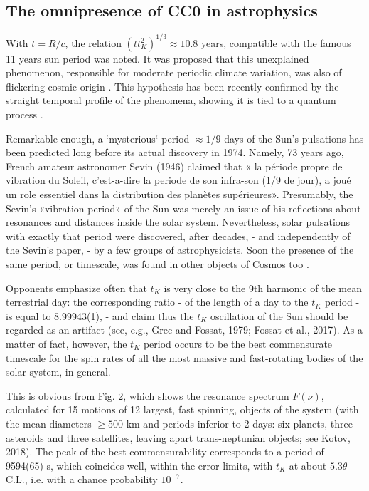 \documentclass[twoside,draft]{article}
\begin{document}
\begin{sloppypar}
\subsection{The omnipresence of CC0 in astrophysics}

With $t = R/c$, the relation $(t t_{K}^2)^{1/3} \approx 10.8$ years, compatible with the famous 11 years sun period was noted. It was proposed that this unexplained phenomenon, responsible for moderate periodic climate variation, was also of flickering cosmic origin \cite{Sanchez3}. This hypothesis has been recently confirmed by the straight temporal profile of the phenomena, showing it is tied to a quantum process \cite{Kotov2}.

Remarkable enough, a `mysterious` period $\approx 1/9$ days of the Sun's pulsations has been predicted long before its actual discovery in 1974. Namely, 73 years ago, French amateur astronomer Sevin (1946) claimed that « la p\'{e}riode propre de vibration du Soleil, c'est-a-dire la periode de son infra-son (1/9 de jour), a jou\'{e} un role essentiel dans la distribution des plan\`{e}tes sup\'{e}rieures». Presumably, the Sevin's «vibration period» of the Sun was merely an issue of his reflections about resonances and distances inside the solar system. Nevertheless, solar pulsations with exactly that period were discovered, after decades, - and independently of the Sevin's paper, - by a few groups of astrophysicists. Soon the presence of the same period, or timescale, was found in other objects of Cosmos too \cite{Kotov1}.

Opponents emphasize often that $t_{K}$ is very close to the 9th harmonic of the mean terrestrial day: the corresponding ratio - of the length of a day to the $t_{K}$ period - is equal to 8.99943(1), - and claim thus the $t_{K}$ oscillation of the Sun should be regarded as an artifact (see, e.g., Grec and Fossat, 1979; Fossat et al., 2017). As a matter of fact, however, the $t_{K}$ period occurs to be the best commensurate timescale for the spin rates of all the most massive and fast-rotating bodies of the solar system, in general.

This is obvious from Fig. 2, which shows the resonance spectrum $F( \nu )$, calculated for 15 motions of 12 largest, fast spinning, objects of the system (with the mean diameters $\geq 500$ km and periods inferior to 2 days: six planets, three asteroids and three satellites, leaving apart trans-neptunian objects; see Kotov, 2018). The peak of the best commensurability corresponds to a period of 9594(65) s, which coincides well, within the error limits, with $t_K$ at about $5.3 \theta$ C.L., i.e. with a chance probability $10^{-7}$.


\end{sloppypar}
\end{document}
